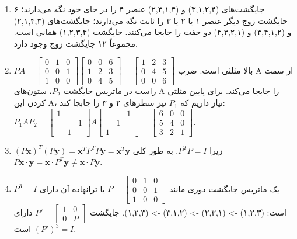 \documentclass[12pt,a4paper]{article}
\begin{document}
{\begin{enumerate}
			\item جایگشت‌های (۳,۱,۲,۴) و (۲,۳,۱,۴) عنصر ۴ را در جای خود نگه می‌دارند؛ ۶ جایگشت زوج دیگر عنصر ۱ یا ۲ یا ۳ را ثابت نگه می‌دارند؛ جایگشت‌های (۲,۱,۴,۳) و (۳,۴,۱,۲) و (۴,۳,۲,۱) دو جفت را جابجا می‌کنند. جایگشت (۱,۲,۳,۴) همانی است. مجموعاً ۱۲ جایگشت زوج وجود دارد.
			
			\item $PA = \begin{bmatrix} 0 & 1 & 0 \\ 0 & 0 & 1 \\ 1 & 0 & 0 \end{bmatrix} \begin{bmatrix} 0 & 0 & 6 \\ 1 & 2 & 3 \\ 0 & 4 & 5 \end{bmatrix} = \begin{bmatrix} 1 & 2 & 3 \\ 0 & 4 & 5 \\ 0 & 0 & 6 \end{bmatrix}$ بالا مثلثی است. ضرب A از سمت راست در ماتریس جایگشت $P_2$، ستون‌های A را جابجا می‌کند. برای پایین مثلثی کردن این A، نیاز داریم که $P_1$ نیز سطرهای ۲ و ۳ را جابجا کند: $P_1AP_2 = \begin{bmatrix} 1 & & \\ & & 1 \\ & 1 & \end{bmatrix} A \begin{bmatrix} & & 1 \\ & 1 & \\ 1 & & \end{bmatrix} = \begin{bmatrix} 6 & 0 & 0 \\ 5 & 4 & 0 \\ 3 & 2 & 1 \end{bmatrix}$.
			
			\item $(P\boldsymbol{x})^T(P\boldsymbol{y}) = \boldsymbol{x}^TP^TP\boldsymbol{y} = \boldsymbol{x}^T\boldsymbol{y}$ زیرا $P^TP=I$. به طور کلی $P\boldsymbol{x} \cdot \boldsymbol{y} = \boldsymbol{x} \cdot P^T\boldsymbol{y} \neq \boldsymbol{x} \cdot P\boldsymbol{y}$.
			
			\item یک ماتریس جایگشت دوری مانند $P = \begin{bmatrix} 0 & 1 & 0 \\ 0 & 0 & 1 \\ 1 & 0 & 0 \end{bmatrix}$ یا ترانهاده آن دارای $P^3=I$ است: (۱,۲,۳) -> (۲,۳,۱) -> (۳,۱,۲) -> (۱,۲,۳). جایگشت $P' = \begin{bmatrix} 1 & 0 \\ 0 & P \end{bmatrix}$ دارای $(P')^3=I$ است.
		\end{enumerate}
		
}
\end{document}
